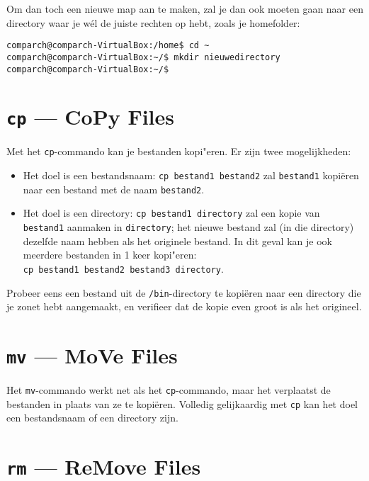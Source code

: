 \documentclass[a4paper,twoside,openany]{memoir}
\begin{document}
Om dan toch een nieuwe map aan te maken, zal je dan ook moeten gaan naar een directory waar je w\'el de juiste rechten op hebt, zoals je homefolder:
\begin{verbatim}
comparch@comparch-VirtualBox:/home$ cd ~
comparch@comparch-VirtualBox:~/$ mkdir nieuwedirectory
comparch@comparch-VirtualBox:~/$
\end{verbatim}

\section{\texttt{cp} --- CoPy Files}

Met het \verb!cp!-commando kan je bestanden kopi"eren. Er zijn twee mogelijkheden:

\begin{itemize}

  \item Het doel is een bestandsnaam: \verb!cp bestand1 bestand2! zal
    \verb!bestand1! kopiëren naar een bestand met de naam \verb!bestand2!.

  \item Het doel is een directory: \verb!cp bestand1 directory! zal een kopie
    van \verb!bestand1! aanmaken in \verb!directory!; het nieuwe bestand zal (in
    die directory) dezelfde naam hebben als het originele bestand. In dit geval
    kan je ook meerdere bestanden in 1 keer kopi"eren:\\
    \verb!cp bestand1 bestand2 bestand3 directory!.

\end{itemize}

Probeer eens een bestand uit de \verb!/bin!-directory te kopiëren naar een
directory die je zonet hebt aangemaakt, en verifieer dat de kopie even groot is
als het origineel.

\section{\texttt{mv} --- MoVe Files}

Het \verb!mv!-commando werkt net als het \verb!cp!-commando, maar het verplaatst
de bestanden in plaats van ze te kopiëren. Volledig gelijkaardig met \verb!cp!
kan het doel een bestandsnaam of een directory zijn.

\section{\texttt{rm} --- ReMove Files}
\end{document}
